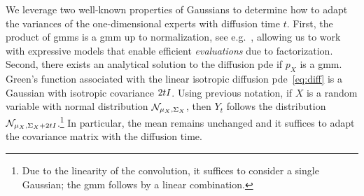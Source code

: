 We leverage two well-known properties of Gaussians to determine how to adapt the variances of the one-dimensional experts with diffusion time \( t \).
First, the product of \glspl{gmm} is a \gls{gmm} up to normalization, see e.g.~\cite{1591840}, allowing us to work with expressive models that enable efficient \emph{evaluations} due to factorization.
Second, there exists an analytical solution to the diffusion \gls{pde} if \( p_X \) is a \gls{gmm}.
Green's function associated with the linear isotropic diffusion \gls{pde}~\eqref{eq:diff} is a Gaussian with isotropic covariance \( \num{2}t I \).
Using previous notation, if \( X \) is a random variable with normal distribution \( \mathcal{N}_{\mu_X, \Sigma_X} \), then \( Y_t \) follows the distribution \( \mathcal{N}_{\mu_X, \Sigma_X + \num{2}tI} \).\footnote{%
	Due to the linearity of the convolution, it suffices to consider a single Gaussian; the \gls{gmm} follows by a linear combination.
}
In particular, the mean remains unchanged and it suffices to adapt the covariance matrix with the diffusion time.


